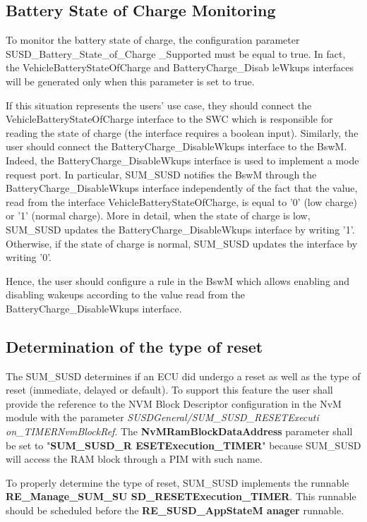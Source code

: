 {\subsection{Battery State of Charge Monitoring}
To monitor the battery state of charge, the configuration parameter SUSD\_Battery\_State\_of\_Charge \_Supported must be equal to true.
In fact, the VehicleBatteryStateOfCharge and BatteryCharge\_Disab leWkups interfaces will be generated only when this parameter is set to true.

If this situation represents the users' use case, they should connect the VehicleBatteryStateOfCharge interface to the SWC which is responsible for reading the state of charge (the interface requires a boolean input).
Similarly, the user should connect the BatteryCharge\_DisableWkups interface to the BswM. Indeed, the BatteryCharge\_DisableWkups interface is used to implement a mode request port. 
In particular, SUM\_SUSD notifies the BswM through the BatteryCharge\_DisableWkups interface independently of the fact that the value, read from the interface VehicleBatteryStateOfCharge, is equal to ’0’ (low
charge) or ’1’ (normal charge). More in detail, when the state of charge is low, SUM\_SUSD updates the BatteryCharge\_DisableWkups interface by writing ’1’. Otherwise, if the state of charge is normal,
SUM\_SUSD updates the interface by writing ’0’.

Hence, the user should configure a rule in the BswM which allows enabling and disabling wakeups according to the value read from the BatteryCharge\_DisableWkups interface. 

\subsection{Determination of the type of reset}
The SUM\_SUSD determines if an ECU did undergo a reset as well as the type of reset (immediate, delayed or default). To support this feature the user shall provide the reference to 
the NVM Block Descriptor configuration in the NvM module with the parameter \textit{SUSDGeneral/SUM\_SUSD\_RESETExecuti on\_TIMERNvmBlockRef}.
The \textbf{NvMRamBlockDataAddress} parameter shall be set to "\textbf{SUM\_SUSD\_R ESETExecution\_TIMER}" because SUM\_SUSD will access the RAM block through a PIM with such name.

To properly determine the type of reset, SUM\_SUSD implements the runnable \textbf{RE\_Manage\_SUM\_SU SD\_RESETExecution\_TIMER}. 
This runnable should be scheduled before the \textbf{RE\_SUSD\_AppStateM anager} runnable.

}
